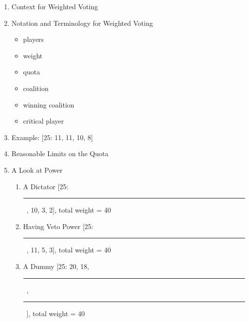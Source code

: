 \documentclass[12pt]{article}
\begin{document}
\begin{enumerate}
\item Context for Weighted Voting\\

\vfill

\item Notation and Terminology for Weighted Voting\\

\begin{itemize}

\item players

\vfill

\item weight

\vfill

\item quota

\vfill

\item coalition

\vfill

\item winning coalition

\vfill


\item critical player
\vfill

\end{itemize}

\item Example: [25: 11, 11, 10, 8]
\vfill

\newpage

\item Reasonable Limits on the Quota\\
\vspace{1in}

\item A Look at Power
	\begin{enumerate}
	\item A Dictator \hspace{1cm} [25:  \rule{.5cm}{.5pt}\ , 10, 3, 2], total weight = 40
	\vfill
	\item Having Veto Power \hspace{1cm} [25: \rule{.5cm}{.5pt}\ , 11, 5, 3], total weight = 40
	\vfill
	\item A Dummy \hspace{1cm} [25: 20, 18, \rule{.5cm}{.5pt}\ , \rule{.5cm}{.5pt}\ ], total weight = 40
	\vfill
	\end{enumerate}
	
\end{enumerate}
\end{document}
